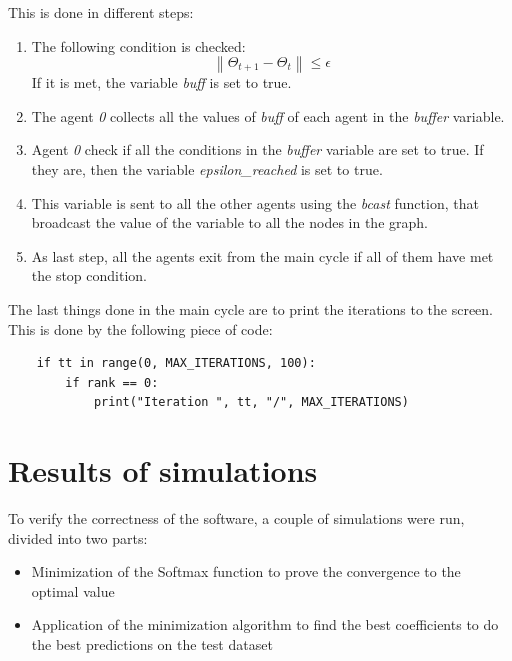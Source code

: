\documentclass[a4paper,11pt,oneside]{book}
\begin{document}
This is done in different steps:
\begin{enumerate}
	\item The following condition is checked:
	\begin{equation}
		\left\lVert \Theta_{t+1} - \Theta_{t} \right\rVert
		\leq \epsilon
	\end{equation}
	If it is met, the variable \textit{buff} is set to true. 
	\item The agent \textit{0} collects all the values of \textit{buff} of each agent in the \textit{buffer} variable.
	\item Agent \textit{0} check if all the conditions in the \textit{buffer} variable are set to true. If they are, then the variable \textit{epsilon\_reached} is set to true.
	\item This variable is sent to all the other agents using the \textit{bcast} function, that broadcast the value of the variable to all the nodes in the graph.
	\item As last step, all the agents exit from the main cycle if all of them have met the stop condition. 
\end{enumerate}

The last things done in the main cycle are to print the iterations to the screen. This is done by the following piece of code:
\begin{lstlisting}
    if tt in range(0, MAX_ITERATIONS, 100):
        if rank == 0:
            print("Iteration ", tt, "/", MAX_ITERATIONS)
\end{lstlisting}



\chapter{Results of simulations} \label{Cap2}
	To verify the correctness of the software, a couple of simulations were run, divided into two parts:
\begin{itemize}
	\item Minimization of the Softmax function to prove the convergence to the optimal value
		\item Application of the minimization algorithm to find the best coefficients to do the best predictions on the test dataset
\end{itemize}
\end{document}
